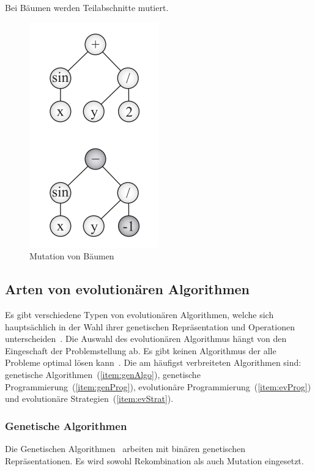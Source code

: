         Bei Bäumen werden Teilabschnitte mutiert.
        \begin{figure}[H]
            \includegraphics[scale=0.8, center]{graphics/mutation_tree}
            \caption{Mutation von Bäumen~\cite[S.29]{book:bioInspired}\label{fig:mutation_tree}}
        \end{figure}


  \subsection{Arten von evolutionären Algorithmen\label{sub:artenEvAlgos}}

    Es gibt verschiedene Typen von evolutionären Algorithmen, welche sich hauptsächlich in der Wahl ihrer genetischen Repräsentation
    und Operationen unterscheiden~\cite{book:introEvComp}.
    Die Auswahl des evolutionären Algorithmus hängt von den Eingeschaft der Problemstellung ab.
    Es gibt keinen Algorithmus der alle Probleme optimal lösen kann~\cite{book:genAlgoDataStructsEvProg}.
    Die am häufigst verbreiteten Algorithmen sind: genetische Algorithmen~(\vref{item:genAlgo}),
    genetische Programmierung~(\vref{item:genProg}), evolutionäre Programmierung~(\vref{item:evProg})
    und evolutionäre Strategien~(\vref{item:evStrat}).

    \subsubsection{Genetische Algorithmen\label{item:genAlgo}}

      Die Genetischen Algorithmen~\cite{book:adapNaturalArtSys} arbeiten mit binären genetischen Repräsentationen.
      Es wird sowohl Rekombination als auch Mutation eingesetzt.

